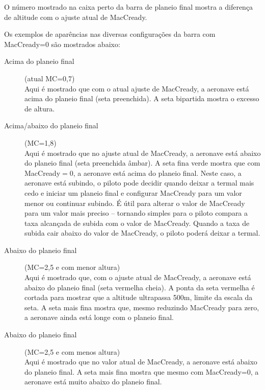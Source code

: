 O número mostrado na caixa perto da barra de planeio final mostra a diferença de altitude com o ajuste atual de MacCready.

Os exemplos de aparências nas diversas configurações da barra com MacCready=0 são mostrados abaixo:

\begin{description}
\item[Acima do planeio final] (atual MC=0,7) \\
  Aqui é mostrado que com o atual ajuste de MacCready, a aeronave está acima do planeio final (seta preenchida).  A seta bipartida mostra o excesso de altura.

\item[Acima/abaixo do planeio final] (MC=1,8) \\
  Aqui é mostrado que no ajuste atual de MacCready, a aeronave está abaixo do planeio final (seta preenchida âmbar).  A seta fina verde mostra que com MacCready$=0$, a aeronave está acima do planeio final. 
 Neste caso, a aeronave está subindo, o piloto pode decidir quando deixar a termal mais cedo e iniciar um planeio final e configurar MacCready para um valor menor ou continuar subindo.
   É útil para alterar o valor de MacCready para um valor mais preciso – tornando simples para o piloto compara a taxa alcançada de subida com o valor de MacCready.  Quando a taxa de subida cair abaixo do valor de MacCready, o piloto poderá deixar a termal.
 
\item[Abaixo do planeio final] (MC=2,5 e com menor altura) \\
  Aqui é mostrado que, com o ajuste atual de MacCready, a aeronave está abaixo do planeio final (seta vermelha cheia).  A ponta da seta vermelha é cortada para mostrar que a altitude ultrapassa 500m, limite da escala da seta.
  A seta mais fina mostra que, mesmo reduzindo MacCready para zero, a aeronave ainda está longe com o planeio final.

\item[Abaixo do planeio final] (MC=2,5 e com menos altura) \\
  Aqui é mostrado que no valor atual de MacCready, a aeronave está abaixo do planeio final.  A seta mais fina
  mostra que mesmo com MacCready=0, a aeronave está muito abaixo do planeio final.
\end{description}


